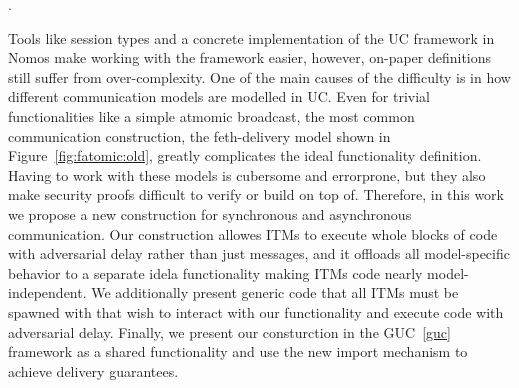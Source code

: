 



.







Tools like session types and a concrete implementation of the UC framework in Nomos make working with the framework easier, however, on-paper definitions still suffer from over-complexity.
One of the main causes of the difficulty is in how different communication models are modelled in UC.
Even for trivial functionalities like a simple atmomic broadcast, the most common communication construction, the feth-delivery model shown in Figure~\ref{fig:fatomic:old}, greatly complicates the ideal functionality definition.
Having to work with these models is cubersome and errorprone, but they also make security proofs difficult to verify or build on top of.
Therefore, in this work we propose a new construction for synchronous and asynchronous communication.
Our construction allowes ITMs to execute whole blocks of code with adversarial delay rather than just messages, and it offloads all model-specific behavior to a separate idela functionality making ITMs code nearly model-independent.
We additionally present generic code that all ITMs must be spawned with that wish to interact with our functionality and execute code with adversarial delay.
Finally, we present our consturction in the GUC~\ref{guc} framework as a shared functionality and use the new import mechanism to achieve delivery guarantees.

